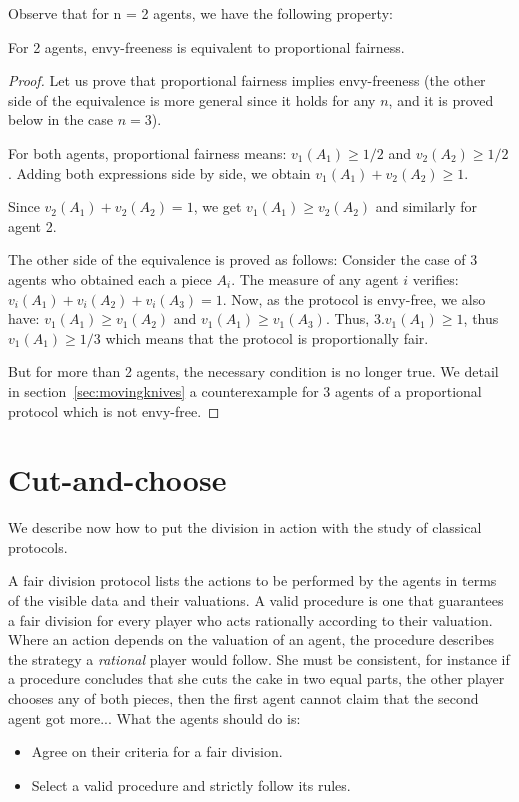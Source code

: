 \bigskip

Observe that for n = 2 agents, we have the following property:

\begin{prop}
For 2 agents, envy-freeness is equivalent to proportional fairness.
\end{prop}

\begin{proof}
Let us prove that proportional fairness implies envy-freeness (the other side of the equivalence is more general since it holds for any $n$, 
and it is proved below in the case $n=3$).

For both agents, proportional fairness means: $v_1(A_1) \geq 1/2$ and $v_2(A_2) \geq 1/2$.
Adding both expressions side by side, we obtain $v_1(A_1)+v_2(A_2) \geq 1$.

Since $v_2(A_1) + v_2(A_2) = 1$, we get 
$v_1(A_1) \geq v_2(A_2)$ and similarly for agent 2. 
\bigskip

The other side of the equivalence is proved as follows: 
Consider the case of $3$ agents who obtained each a piece $A_i$.
The measure of any agent $i$ verifies: $v_i(A_1)+v_i(A_2)+v_i(A_3) = 1$.
Now, as the protocol is envy-free, we also have: $v_1(A_1) \geq v_1(A_2)$ and $v_1(A_1) \geq v_1(A_3)$.
Thus, $3.v_1(A_1) \geq 1$, thus $v_1(A_1) \geq 1/3$ which means that the protocol is proportionally fair. 
\bigskip

But for more than 2 agents, the necessary condition is no longer true.
We detail in section~\ref{sec:movingknives} a counterexample for 3 agents of a proportional protocol which is not envy-free.
\end{proof}


\section{Cut-and-choose}

We describe now how to put the division in action with the study of classical protocols.

A fair division protocol lists the actions to be performed by the agents in terms of the visible data and their valuations. 
A valid procedure is one that guarantees a fair division for every player who acts rationally according to their valuation. 
Where an action depends on the valuation of an agent, the procedure describes the strategy a \textit{rational} player would follow. 
She must be consistent,
for instance if a procedure concludes that she cuts the cake in two equal parts, the other player chooses any of both pieces, 
then the first agent cannot claim that the second agent got more...
What the agents should do is:
\begin{itemize}
\item Agree on their criteria for a fair division.
\item Select a valid procedure and strictly follow its rules.
\end{itemize}


